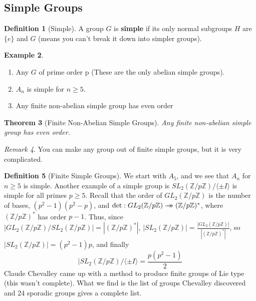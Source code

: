 \documentclass[12pt]{article}
\newtheorem{thm}{Theorem}[section]
\theoremstyle{definition}
\newtheorem{defn}[thm]{Definition}
\newtheorem{eg}[thm]{Example}
\theoremstyle{remark}
\newtheorem{rmk}[thm]{Remark}
\numberwithin{equation}{section}
\newcommand\Z{\mathbb Z}    %
\newcommand\B[1]{\textbf{ #1}}
\newcommand{\surrightarrow}{\rightarrow\mathrel{\mkern-14mu}\rightarrow}
\begin{document}
\subsection{Simple Groups}

\begin{defn}[Simple]
        A group $G$ is \B{simple} if its only normal subgroups $H$ are $\{e\}$ and $G$ (means you can't break it down into simpler groups).
\end{defn}
\begin{eg}
        \begin{enumerate}
                \item Any $G$ of prime order p (These are the only abelian simple groups).
                \item $A_n$ is simple for $n \geq 5$.
                \item Any finite non-abelian simple group has even order
        \end{enumerate}
\end{eg}
\vspace{15pt}
\begin{thm}[Finite Non-Abelian Simple Groups]
        Any finite non-abelian simple group has even order.
\end{thm}


\vspace{15pt}

\begin{rmk}
        You can make any group out of finite simple groups, but it is very complicated.
\end{rmk}

\vspace{15pt}

\begin{defn}[Finite Simple Groups]
        We start with $A_5$, and we see that $A_n$ for $n \geq 5$ is simple. Another example of a simple group is $SL_2(\Z/p\Z)/\langle \pm I\rangle$ is simple for all primes $p \geq 5$. Recall that the order of $GL_2(\Z/p\Z)$ is the number of bases, $(p^2-1)(p^2-p)$, and $\det:GL_2(\Z/p\Z) \surrightarrow (\Z/p\Z)^*$, where $(\Z/p\Z)^*$ has order $p-1$. Thus, since $|GL_2(\Z/p\Z)/SL_2(\Z/p\Z)| = |(\Z/p\Z)^*|$, $|SL_2(\Z/p\Z)| = \frac{|GL_2(\Z/p\Z)|}{|(\Z/p\Z)^*|}$, so $|SL_2(\Z/p\Z)| = (p^2-1)p$, and finally \begin{equation}
                |SL_2(\Z/p\Z)/\langle \pm I \rangle = \frac{p(p^2-1)}{2}
        \end{equation}
        Claude Chevalley came up with a method to produce finite groups of Lie type (this wasn't complete). What we find is the list of groups Chevalley discovered and 24 sporadic groups gives a complete list.
\end{defn}
\end{document}
